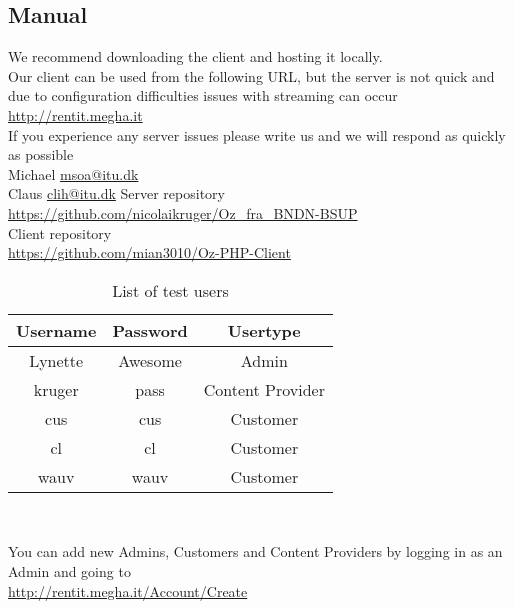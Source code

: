 \subsection{Manual}
We recommend downloading the client and hosting it locally.
\\\newline Our client can be used from the following URL, but the server is not quick and due to configuration difficulties issues with streaming can occur
\\\url{http://rentit.megha.it}
\\\newline If you experience any server issues please write us and we will respond as quickly as possible
\\Michael \url{msoa@itu.dk}
\\Claus \url{clih@itu.dk}
Server repository
\\\url{https://github.com/nicolaikruger/Oz_fra_BNDN-BSUP}
\\Client repository
\\\url{https://github.com/mian3010/Oz-PHP-Client}
\begin{table}[H]
\centering
\begin{tabular}{|c|c|c|}
\hline
Username & Password & Usertype \\\hline\hline
Lynette & Awesome & Admin \\\hline
kruger & pass & Content Provider \\\hline
cus & cus & Customer \\\hline
cl & cl & Customer \\\hline
wauv & wauv & Customer \\\hline
\end{tabular}\\
\caption{List of test users}
\end{table}
You can add new Admins, Customers and Content Providers by logging in as an Admin and going to
\\\url{http://rentit.megha.it/Account/Create}
\newpage